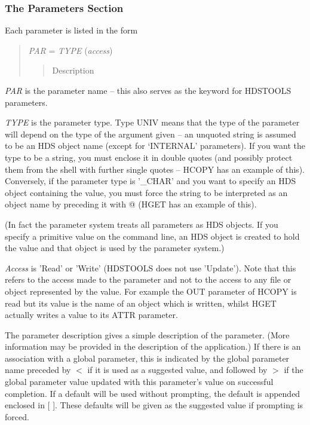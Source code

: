 \documentclass[twoside,11pt,nolof]{starlink}
\begin{document}
\subsubsection{The Parameters Section}
Each parameter is listed in the form
\begin{quote}
\textit{PAR} = \textit{TYPE} (\textit{access})
\begin{quote}
Description
\end{quote}
\end{quote}
\textit{PAR} is the parameter name -- this also serves as the keyword for
HDSTOOLS parameters.

\textit{TYPE} is the parameter type. Type UNIV means that the type of the
parameter will depend on the type of the argument given -- an unquoted string
is assumed to be an HDS object name (except for `INTERNAL' parameters).
If you want the type to be a string, you must enclose it in double quotes (and
possibly protect them from the shell with further single quotes -- HCOPY has
an example of this). Conversely, if the parameter type is '\_CHAR' and you want
to specify an HDS object containing the value, you must force the string to be
interpreted as an object name by preceding it with @ (HGET has an example of
this).

(In fact the parameter system treats all parameters as HDS objects. If you
specify a primitive value on the command line, an HDS object is created to
hold the value and that object is used by the parameter system.)

\textit{Access} is 'Read' or 'Write' (HDSTOOLS does not use 'Update'). Note
that this refers to the access made to the parameter and not to the access to
any file or object represented by the value. For example the OUT parameter of
HCOPY is read but its value is the name of an object which is written, whilst
HGET actually writes a value to its ATTR parameter.

The parameter description gives a simple description of the parameter.
(More information may be provided in the description of the application.)
If there is an association with a global parameter, this is indicated by the
global parameter name preceded by $<$ if it is used as a suggested value, and
followed by $>$ if the global parameter value updated with this parameter's
value on successful completion.
If a default will be used without prompting, the default is appended enclosed
in [ ].
These defaults will be given as the suggested value if prompting is forced.
\end{document}
